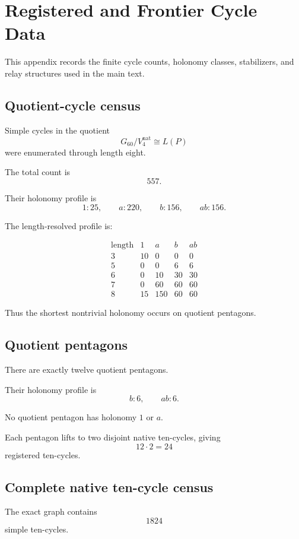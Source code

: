 \section{Registered and Frontier Cycle Data}

This appendix records the finite cycle counts, holonomy classes,
stabilizers, and relay structures used in the main text.

\subsection{Quotient-cycle census}

Simple cycles in the quotient
\[
G_{60}/V_4^{\mathrm{nat}}\cong L(P)
\]
were enumerated through length eight.

The total count is
\[
557.
\]

Their holonomy profile is
\[
1:25,
\qquad
a:220,
\qquad
b:156,
\qquad
ab:156.
\]

The length-resolved profile is:

\[
\begin{array}{c|rrrr}
\text{length} & 1 & a & b & ab\\
\hline
3 & 10 & 0 & 0 & 0\\
5 & 0 & 0 & 6 & 6\\
6 & 0 & 10 & 30 & 30\\
7 & 0 & 60 & 60 & 60\\
8 & 15 & 150 & 60 & 60
\end{array}
\]

Thus the shortest nontrivial holonomy occurs on quotient pentagons.

\subsection{Quotient pentagons}

There are exactly twelve quotient pentagons.

Their holonomy profile is
\[
b:6,
\qquad
ab:6.
\]

No quotient pentagon has holonomy \(1\) or \(a\).

Each pentagon lifts to two disjoint native ten-cycles, giving
\[
12\cdot2=24
\]
registered ten-cycles.

\subsection{Complete native ten-cycle census}

The exact graph contains
\[
1824
\]
simple ten-cycles.

